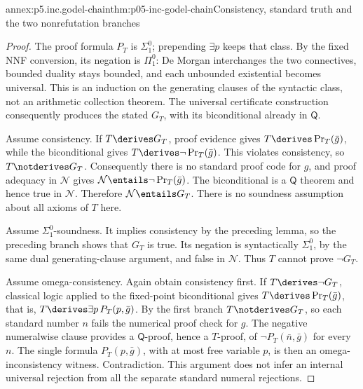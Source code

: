 \begin{annexitem}{annex:p5.inc.godel-chain}{thm:p05-inc-godel-chain}{Consistency, standard truth and the two nonrefutation branches}
\begin{proof}
The proof formula \(P_T\) is \(\Sigma^0_1\); prepending
\(\exists p\) keeps that class. By the fixed NNF conversion,
its negation is \(\Pi^0_1\): De Morgan interchanges the two
connectives, bounded duality stays bounded, and each unbounded
existential becomes universal. This is an induction on the generating
clauses of the syntactic class, not an arithmetic collection theorem.
The universal certificate construction consequently produces the
stated \(G_T\), with its biconditional already in \(\mathsf Q\).

Assume consistency. If \(T\derives G_T\), proof evidence gives
\(T\derives\operatorname{Pr}_T(\bar g)\), while the biconditional
gives \(T\derives\neg\operatorname{Pr}_T(\bar g)\). This violates
consistency, so \(T\notderives G_T\). Consequently there is no
standard proof code for \(g\), and proof adequacy in \(\mathcal N\)
gives \(\mathcal N\entails\neg\operatorname{Pr}_T(\bar g)\).
The biconditional is a \(\mathsf Q\) theorem and hence true in
\(\mathcal N\). Therefore \(\mathcal N\entails G_T\).
There is no soundness assumption about all axioms of \(T\) here.

Assume \(\Sigma^0_1\)-soundness. It implies consistency by the
preceding lemma, so the preceding branch shows that \(G_T\) is true.
Its negation is syntactically \(\Sigma^0_1\), by the same dual
generating-clause argument, and false in \(\mathcal N\).
Thus \(T\) cannot prove \(\neg G_T\).

Assume omega-consistency. Again obtain consistency first. If
\(T\derives\neg G_T\), classical logic applied to the fixed-point
biconditional gives \(T\derives\operatorname{Pr}_T(\bar g)\),
that is, \(T\derives\exists p\,P_T(p,\bar g)\).
By the first branch \(T\notderives G_T\), so each standard number
\(n\) fails the numerical proof check for \(g\). The negative
numeralwise clause provides a \(\mathsf Q\)-proof, hence a
\(T\)-proof, of \(\neg P_T(\bar n,\bar g)\) for every \(n\).
The single formula \(P_T(p,\bar g)\), with at most free variable
\(p\), is then an omega-inconsistency witness. Contradiction.
This argument does not infer an internal universal rejection from all
the separate standard numeral rejections.


\end{proof}
\end{annexitem}
